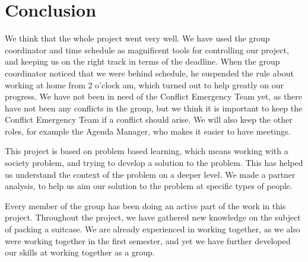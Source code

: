 \chapter{Conclusion}
We think that the whole project went very well. We have used the group coordinator and time schedule as magnificent tools for controlling our project, and keeping us on the right track in terms of the deadline. When the group coordinator noticed that we were behind schedule, he suspended the rule about working at home from 2 o'clock am, which turned out to help greatly on our progress. We have not been in need of the Conflict Emergency Team yet, as there have not been any conflicts in the group, but we think it is important to keep the Conflict Emergency Team if a conflict should arise. We will also keep the other roles, for example the Agenda Manager, who makes it easier to have meetings. 

This project is based on problem based learning, which means working with a society problem, and trying to develop a solution to the problem. This has helped us understand the context of the problem on a deeper level. We made a partner analysis, to help us aim our solution to the problem at specific types of people.

Every member of the group has been doing an active part of the work in this project. Throughout the project, we have gathered new knowledge on the subject of packing a suitcase. We are already experienced in working together, as we also were working together in the first semester, and yet we have further developed our skills at working together as a group. 